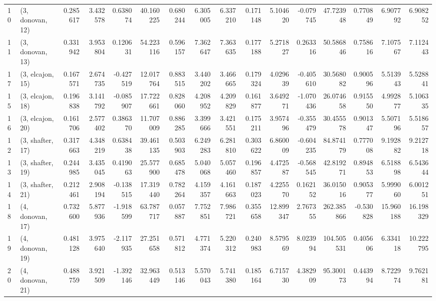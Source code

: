 \begin{tabular}{llrrrrrrrrrrrrrr}
10 &  (3, donovan, 12) &   0.285617 &  3.432578 &  0.638074 &  40.160225 &  0.680244 &   6.305005 &  6.337210 &  0.171148 &   5.104620 & -0.079745 &   47.723948 &  0.770849 &   6.907792 &   6.908252 \\
11 &  (3, donovan, 13) &   0.331942 &  3.953804 &  0.120631 &  54.223116 &  0.596157 &   7.362647 &  7.363635 &  0.177188 &   5.271827 &  0.263316 &   50.586846 &  0.758616 &   7.107567 &   7.112443 \\
17 &  (3, elcajon, 15) &   0.167571 &  2.674735 & -0.427519 &  12.017764 &  0.883515 &   3.440202 &  3.466665 &  0.179324 &   4.029639 & -0.405610 &   30.568082 &  0.900596 &   5.513943 &   5.528841 \\
15 &  (3, elcajon, 18) &   0.196838 &  3.141792 & -0.085907 &  17.722661 &  0.828060 &   4.208952 &  4.209829 &  0.161877 &   3.649271 & -1.070436 &   26.074658 &  0.915550 &   4.992877 &   5.106335 \\
16 &  (3, elcajon, 20) &   0.161706 &  2.577402 &  0.386370 &  11.707009 &  0.886285 &   3.399666 &  3.421551 &  0.175211 &   3.957496 & -0.355479 &   30.455578 &  0.901347 &   5.507196 &   5.518657 \\
12 &  (3, shafter, 17) &   0.317663 &  4.348219 &  0.638438 &  39.461135 &  0.503903 &   6.249283 &  6.281810 &  0.303622 &   6.860009 & -0.604235 &   84.874179 &  0.777008 &   9.192882 &   9.212718 \\
13 &  (3, shafter, 19) &   0.244985 &  3.435045 &  0.419063 &  25.577900 &  0.685478 &   5.040068 &  5.057460 &  0.196857 &   4.472587 & -0.568545 &   42.819271 &  0.894853 &   6.518898 &   6.543644 \\
14 &  (3, shafter, 21) &   0.212461 &  2.908194 & -0.138515 &  17.319440 &  0.782264 &   4.159357 &  4.161663 &  0.187023 &   4.225570 &  0.162152 &   36.015016 &  0.905377 &   5.999060 &   6.001251 \\
18 &  (4, donovan, 17) &   0.732600 &  5.877936 & -1.918599 &  63.787717 &  0.057887 &   7.752851 &  7.986721 &  0.355658 &  12.899347 &  2.767355 &  262.385866 & -0.530828 &  15.960188 &  16.198329 \\
19 &  (4, donovan, 19) &   0.481128 &  3.975640 & -2.117935 &  27.251658 &  0.571812 &   4.771374 &  5.220312 &  0.240983 &   8.579569 &  8.023994 &  104.505531 &  0.405606 &   6.334118 &  10.222795 \\
20 &  (4, donovan, 21) &   0.488759 &  3.921509 & -1.392146 &  32.963449 &  0.513146 &   5.570043 &  5.741380 &  0.185164 &   6.715730 &  4.382909 &   95.300173 &  0.443994 &   8.722974 &   9.762181 \\

\end{tabular}

